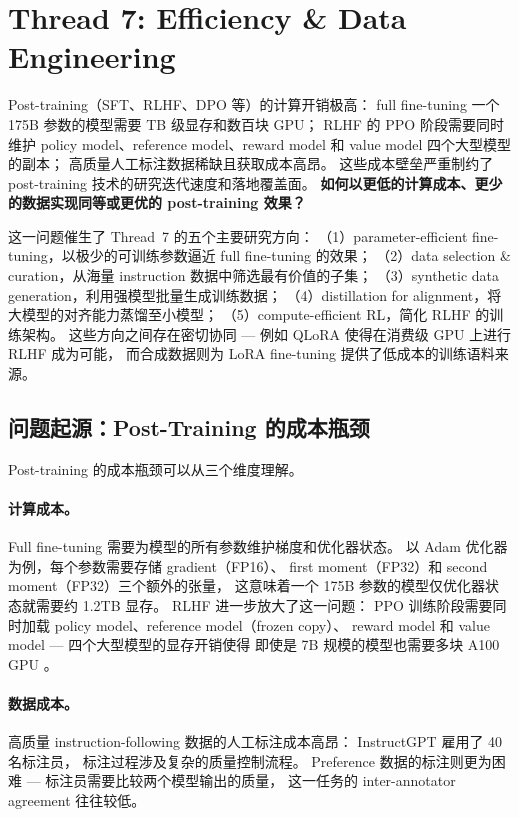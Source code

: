 \section{Thread 7: Efficiency \& Data Engineering}
\label{sec:t7}

\begin{problembox}
Post-training（SFT、RLHF、DPO 等）的计算开销极高：
full fine-tuning 一个 175B 参数的模型需要 TB 级显存和数百块 GPU；
RLHF 的 PPO 阶段需要同时维护 policy model、reference model、reward model 和 value model 四个大型模型的副本；
高质量人工标注数据稀缺且获取成本高昂。
这些成本壁垒严重制约了 post-training 技术的研究迭代速度和落地覆盖面。
\textbf{如何以更低的计算成本、更少的数据实现同等或更优的 post-training 效果？}
\end{problembox}

\noindent
这一问题催生了 Thread~7 的五个主要研究方向：
（1）parameter-efficient fine-tuning，以极少的可训练参数逼近 full fine-tuning 的效果；
（2）data selection \& curation，从海量 instruction 数据中筛选最有价值的子集；
（3）synthetic data generation，利用强模型批量生成训练数据；
（4）distillation for alignment，将大模型的对齐能力蒸馏至小模型；
（5）compute-efficient RL，简化 RLHF 的训练架构。
这些方向之间存在密切协同 --- 例如 QLoRA 使得在消费级 GPU 上进行 RLHF 成为可能，
而合成数据则为 LoRA fine-tuning 提供了低成本的训练语料来源。

\subsection{问题起源：Post-Training 的成本瓶颈}
\label{sec:t7-origin}

Post-training 的成本瓶颈可以从三个维度理解。

\paragraph{计算成本。}
Full fine-tuning 需要为模型的所有参数维护梯度和优化器状态。
以 Adam 优化器为例，每个参数需要存储 gradient（FP16）、
first moment（FP32）和 second moment（FP32）三个额外的张量，
这意味着一个 175B 参数的模型仅优化器状态就需要约 1.2TB 显存。
RLHF 进一步放大了这一问题：
PPO 训练阶段需要同时加载 policy model、reference model（frozen copy）、
reward model 和 value model --- 四个大型模型的显存开销使得
即使是 7B 规模的模型也需要多块 A100 GPU \cite{santacroce2023efficient}。

\paragraph{数据成本。}
高质量 instruction\hyp{}following 数据的人工标注成本高昂：
InstructGPT \cite{ouyang2022instructgpt} 雇用了 40 名标注员，
标注过程涉及复杂的质量控制流程。
Preference 数据的标注则更为困难 ---
标注员需要比较两个模型输出的质量，
这一任务的 inter-annotator agreement 往往较低。

